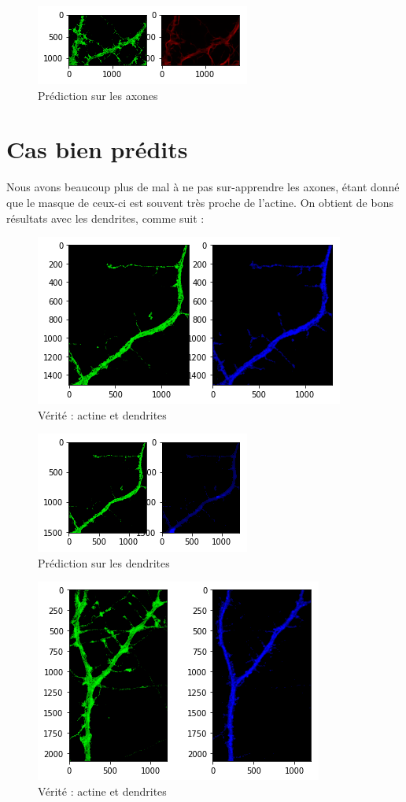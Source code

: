 \documentclass{report}
\begin{document}
\begin{figure}[H]
\centering
\includegraphics[scale=0.8]{"result_overfit"}
\caption{Prédiction sur les axones}
\end{figure}

\section{Cas bien prédits}

Nous avons beaucoup plus de mal à ne pas sur-apprendre les axones, étant donné
que le masque de ceux-ci est souvent très proche de l'actine. On obtient de bons
résultats avec les dendrites, comme suit :

\begin{figure}[H]
\centering
\includegraphics[scale=0.5]{"good_result_truth"}
\caption{Vérité : actine et dendrites}
\end{figure}

\begin{figure}[H]
\centering
\includegraphics[scale=0.8]{"good_result"}
\caption{Prédiction sur les dendrites}
\end{figure}

\begin{figure}[H]
\centering
\includegraphics[scale=0.5]{"2_truth"}
\caption{Vérité : actine et dendrites}
\end{figure}
\end{document}
